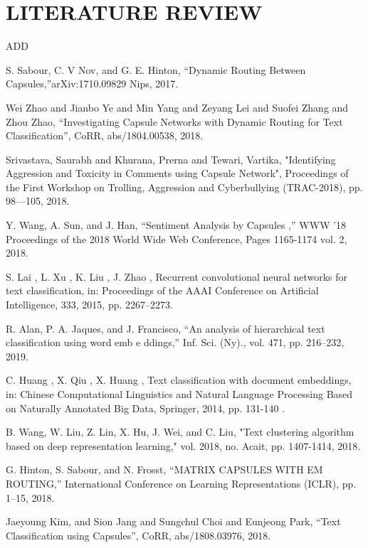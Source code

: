 \documentclass[a4paper,12pt]{report}
\begin{document}
\chapter{LITERATURE REVIEW}
ADD 

\newpage
{}
\renewcommand\bibname{\textbf{REFERENCES}}


\begin{thebibliography}{2}
S. Sabour, C. V Nov, and G. E. Hinton, “Dynamic Routing Between Capsules,”arXiv:1710.09829  Nips, 2017.

Wei Zhao and Jianbo Ye and Min Yang and Zeyang       Lei and Suofei Zhang and Zhou Zhao, “Investigating Capsule Networks with Dynamic Routing for Text Classification”, CoRR, abs/1804.00538, 2018.

Srivastava, Saurabh and Khurana, Prerna and Tewari, Vartika, "Identifying Aggression and Toxicity in Comments using Capsule Network", Proceedings of the First Workshop on Trolling, Aggression and Cyberbullying (TRAC-2018), pp. 98—105, 2018. 


Y. Wang, A. Sun, and J. Han, “Sentiment Analysis by Capsules ,” WWW '18 Proceedings of the 2018 World Wide Web Conference, Pages 1165-1174 vol. 2, 2018.

S. Lai , L. Xu , K. Liu , J. Zhao , Recurrent convolutional neural networks for text classification, in: Proceedings of the AAAI Conference on Artificial Intelligence, 333, 2015, pp. 2267–2273.


R. Alan, P. A. Jaques, and J. Francisco, “An analysis of hierarchical text classification using word emb e ddings,” Inf. Sci. (Ny)., vol. 471, pp. 216–232, 2019.

C. Huang , X. Qiu , X. Huang , Text classification with document embeddings, in: Chinese Computational Linguistics and Natural Language Processing Based on Naturally Annotated Big Data,
Springer, 2014, pp. 131-140 .

B. Wang, W. Liu, Z. Lin, X. Hu, J. Wei, and C. Liu, "Text clustering algorithm based on deep representation learning," vol. 2018, no. Acait, pp. 1407-1414, 2018.

G. Hinton, S. Sabour, and N. Frosst, “MATRIX CAPSULES WITH EM ROUTING,” International Conference on Learning Representations (ICLR), pp. 1–15, 2018.

Jaeyoung Kim, and Sion Jang and Sungchul Choi and              Eunjeong Park, “Text Classification using Capsules”, CoRR, abs/1808.03976, 2018. 


\end{thebibliography}
\end{document}
